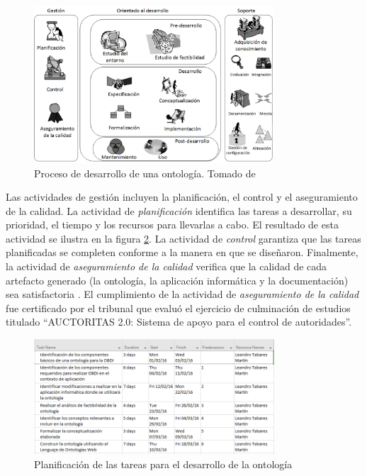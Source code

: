 \begin{figure}
\begin{center}
	\includegraphics[width=0.8\textwidth]{img/Diagrama_METHONTOLOGY.png}
\end{center}
\caption{Proceso de desarrollo de una ontología. Tomado de \citep{Gomez-Perez:2007:OEE:1199560}}
\label{fig: methontology}
\end{figure}

Las actividades de gestión incluyen la planificación, el control y el aseguramiento de la calidad. La actividad de \textit{planificación} identifica las tareas a desarrollar, su prioridad, el tiempo y los recursos para llevarlas a cabo. El resultado de esta actividad se ilustra en la figura \ref{fig: planificacion}. La actividad de \textit{control} garantiza que las tareas planificadas se completen conforme a la manera en que se diseñaron. Finalmente, la actividad de \textit{aseguramiento de la calidad} verifica que la calidad de cada artefacto generado (la ontología, la aplicación informática y la documentación) sea satisfactoria \citep{Gomez-Perez:2007:OEE:1199560}. El cumplimiento de la actividad de \textit{aseguramiento de la calidad} fue certificado por el tribunal que evaluó el ejercicio de culminación de estudios titulado ``AUCTORITAS 2.0: Sistema de apoyo para el control de autoridades''.

\begin{figure}
\begin{center}
	\includegraphics[width=0.8\textwidth]{img/planificacionTareas.PNG}
\end{center}
\caption{Planificación de las tareas para el desarrollo de la ontología}
\label{fig: planificacion}
\end{figure}

